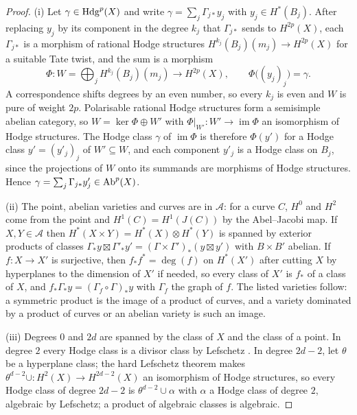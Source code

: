 \begin{proof}
(i) Let $\gamma\in\mathrm{Hdg}^{p}(X)$ and write $\gamma=\sum_{j}\Gamma_{j*}y_{j}$ with $y_{j}\in H^{*}(B_{j})$. After replacing $y_{j}$ by its component in the degree $k_{j}$ that $\Gamma_{j*}$ sends to $H^{2p}(X)$, each $\Gamma_{j*}$ is a morphism of rational Hodge structures $H^{k_{j}}(B_{j})(m_{j})\to H^{2p}(X)$ for a suitable Tate twist, and the sum is a morphism
\[
\Phi\colon W=\bigoplus_{j}H^{k_{j}}(B_{j})(m_{j})\longrightarrow H^{2p}(X),\qquad \Phi\bigl((y_{j})_{j}\bigr)=\gamma .
\]
A correspondence shifts degrees by an even number, so every $k_{j}$ is even and $W$ is pure of weight $2p$. Polarisable rational Hodge structures form a semisimple abelian category, so $W=\ker\Phi\oplus W'$ with $\Phi|_{W'}\colon W'\to\operatorname{im}\Phi$ an isomorphism of Hodge structures. The Hodge class $\gamma$ of $\operatorname{im}\Phi$ is therefore $\Phi(y')$ for a Hodge class $y'=(y'_{j})_{j}$ of $W'\subseteq W$, and each component $y'_{j}$ is a Hodge class on $B_{j}$, since the projections of $W$ onto its summands are morphisms of Hodge structures. Hence $\gamma=\sum_{j}\Gamma_{j*}y'_{j}\in\mathrm{Ab}^{p}(X)$.

(ii) The point, abelian varieties and curves are in $\mathcal{A}$: for a curve $C$, $H^{0}$ and $H^{2}$ come from the point and $H^{1}(C)=H^{1}(J(C))$ by the Abel--Jacobi map. If $X,Y\in\mathcal{A}$ then $H^{*}(X\times Y)=H^{*}(X)\otimes H^{*}(Y)$ is spanned by exterior products of classes $\Gamma_{*}y\boxtimes\Gamma'_{*}y'=(\Gamma\times\Gamma')_{*}(y\boxtimes y')$ with $B\times B'$ abelian. If $f\colon X\to X'$ is surjective, then $f_{*}f^{*}=\deg(f)$ on $H^{*}(X')$ after cutting $X$ by hyperplanes to the dimension of $X'$ if needed, so every class of $X'$ is $f_{*}$ of a class of $X$, and $f_{*}\Gamma_{*}y=(\Gamma_{f}\circ\Gamma)_{*}y$ with $\Gamma_{f}$ the graph of $f$. The listed varieties follow: a symmetric product is the image of a product of curves, and a variety dominated by a product of curves or an abelian variety is such an image.

(iii) Degrees $0$ and $2d$ are spanned by the class of $X$ and the class of a point. In degree $2$ every Hodge class is a divisor class by Lefschetz \cite{Lef24}. In degree $2d-2$, let $\theta$ be a hyperplane class; the hard Lefschetz theorem makes $\theta^{d-2}\cup\colon H^{2}(X)\to H^{2d-2}(X)$ an isomorphism of Hodge structures, so every Hodge class of degree $2d-2$ is $\theta^{d-2}\cup\alpha$ with $\alpha$ a Hodge class of degree $2$, algebraic by Lefschetz; a product of algebraic classes is algebraic.
\end{proof}

